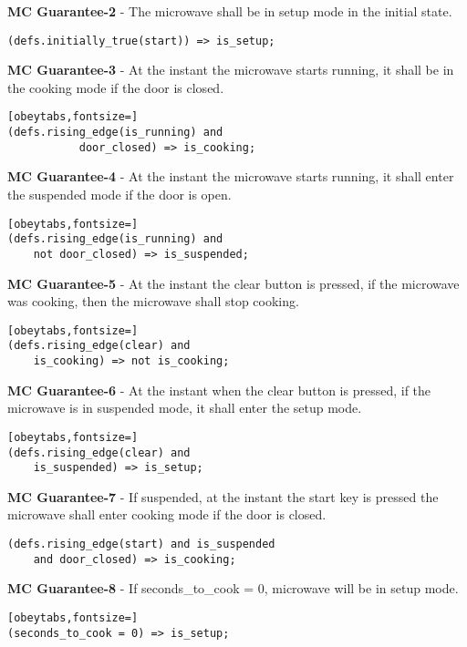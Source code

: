\begin{requirement}
\textbf{MC Guarantee-2} - The microwave shall be in setup mode in the initial
state.
\begin{verbatim}
(defs.initially_true(start)) => is_setup;
\end{verbatim}
\label{req:mic2}
\end{requirement}
%
\begin{requirement}
\textbf{MC Guarantee-3} - At the instant the microwave starts running, it shall
be in the cooking mode if the door is closed.
\begin{Verbatim}[obeytabs,fontsize=]
(defs.rising_edge(is_running) and
	       door_closed) => is_cooking;
\end{Verbatim}
\label{req:mic3}
\end{requirement}
%
\begin{requirement}
\textbf{MC Guarantee-4} - At the instant the microwave starts running, it shall
enter the suspended mode if the door is open.
\begin{Verbatim}[obeytabs,fontsize=]
(defs.rising_edge(is_running) and
	not door_closed) => is_suspended;
\end{Verbatim}
\label{req:mic4}
\end{requirement}
%
\begin{requirement}
\textbf{MC Guarantee-5} - At the instant the clear button is pressed, if the
microwave was cooking, then the microwave shall stop cooking.
\begin{Verbatim}[obeytabs,fontsize=]
(defs.rising_edge(clear) and
	is_cooking) => not is_cooking;
\end{Verbatim}
\label{req:mic5}
\end{requirement}
%
\begin{requirement}
\textbf{MC Guarantee-6} - At the instant when the clear button is pressed, if
the microwave is in suspended mode, it shall enter the setup mode.
\begin{Verbatim}[obeytabs,fontsize=]
(defs.rising_edge(clear) and
	is_suspended) => is_setup;
\end{Verbatim}
\label{req:mic6}
\end{requirement}
%
\begin{requirement}
\textbf{MC Guarantee-7} - If suspended, at the instant the start key is pressed
the microwave shall enter cooking mode if the door is closed.
\begin{Verbatim}[obeytabs]
(defs.rising_edge(start) and is_suspended
	and door_closed) => is_cooking;
\end{Verbatim}
\label{req:mic7}
\end{requirement}
%
\begin{requirement}
\textbf{MC Guarantee-8} - If seconds\_to\_cook = 0, microwave will be in setup
mode.
\begin{Verbatim}[obeytabs,fontsize=]
(seconds_to_cook = 0) => is_setup;
\end{Verbatim}
\label{req:mic8}
\end{requirement}

